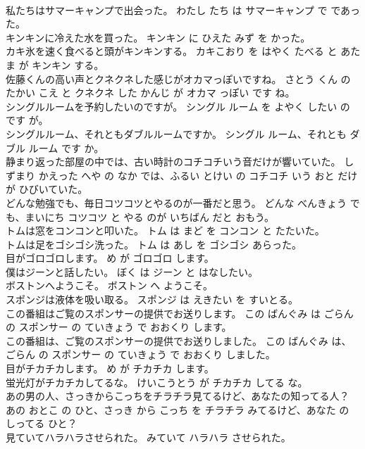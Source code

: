 \documentclass[8pt]{extreport}
\begin{document}
\begin{CJK}{UTF8}{min}
\\	私たちはサマーキャンプで出会った。	わたし たち は サマーキャンプ で であった。	
\\	キンキンに冷えた水を買った。	キンキン に ひえた みず を かった。	
\\	カキ氷を速く食べると頭がキンキンする。	カキこおり を はやく たべる と あたま が キンキン する。	
\\	佐藤くんの高い声とクネクネした感じがオカマっぽいですね。	さとう くん の たかい こえ と クネクネ した かんじ が オカマ っぽい です ね。	
\\	シングルルームを予約したいのですが。	シングル ルーム を よやく したい の です が。	
\\	シングルルーム、それともダブルルームですか。	シングル ルーム、それとも ダブル ルーム です か。	
\\	静まり返った部屋の中では、古い時計のコチコチいう音だけが響いていた。	しずまり かえった へや の なか では、ふるい とけい の コチコチ いう おと だけ が ひびいていた。	
\\	どんな勉強でも、毎日コツコツとやるのが一番だと思う。	どんな べんきょう でも、まいにち コツコツ と やる のが いちばん だと おもう。	
\\	トムは窓をコンコンと叩いた。	トム は まど を コンコン と たたいた。	
\\	トムは足をゴシゴシ洗った。	トム は あし を ゴシゴシ あらった。	
\\	目がゴロゴロします。	め が ゴロゴロ します。	
\\	僕はジーンと話したい。	ぼく は ジーン と はなしたい。	
\\	ボストンへようこそ。	ボストン へ ようこそ。	
\\	スポンジは液体を吸い取る。	スポンジ は えきたい を すいとる。	
\\	この番組はご覧のスポンサーの提供でお送りします。	この ばんぐみ は ごらん の スポンサー の ていきょう で おおくり します。	
\\	この番組は、ご覧のスポンサーの提供でお送りしました。	この ばんぐみ は、ごらん の スポンサー の ていきょう で おおくり しました。	
\\	目がチカチカします。	め が チカチカ します。	
\\	蛍光灯がチカチカしてるな。	けいこうとう が チカチカ してる な。	
\\	あの男の人、さっきからこっちをチラチラ見てるけど、あなたの知ってる人？	あの おとこ の ひと、さっき から こっち を チラチラ みてるけど、あなた の しってる ひと？	
\\	見ていてハラハラさせられた。	みていて ハラハラ させられた。	

\end{CJK}
\end{document}

